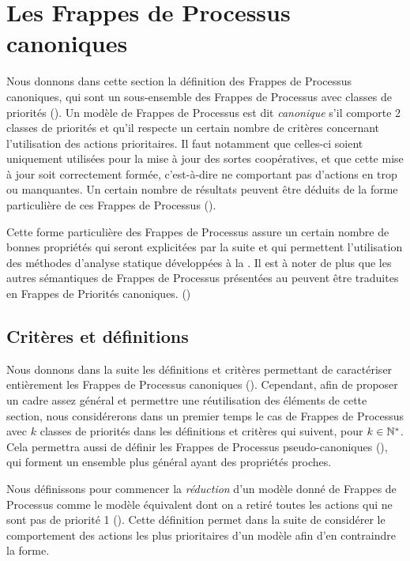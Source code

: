 
\section{Les Frappes de Processus canoniques}

Nous donnons dans cette section la définition des Frappes de Processus canoniques,
qui sont un sous-ensemble des Frappes de Processus avec classes de priorités
().
Un modèle de Frappes de Processus est dit \emph{canonique} s'il comporte 2 classes de priorités
et qu'il respecte un certain nombre de critères concernant l'utilisation des actions prioritaires.
Il faut notamment que celles-ci soient uniquement utilisées pour la mise à jour des sortes
coopératives, et que cette mise à jour soit correctement formée,
c'est-à-dire ne comportant pas d'actions en trop ou manquantes.
Un certain nombre de résultats peuvent être déduits de la forme particulière de ces
Frappes de Processus ().

Cette forme particulière des Frappes de Processus assure un certain nombre de bonnes propriétés
qui seront explicitées par la suite et qui permettent l'utilisation des méthodes d'analyse statique
développées à la .
Il est à noter de plus que les autres sémantiques de Frappes de Processus
présentées au 
peuvent être traduites en Frappes de Priorités canoniques.
()



\subsection{Critères et définitions}

Nous donnons dans la suite les définitions et critères permettant de caractériser entièrement
les Frappes de Processus canoniques ().
Cependant, afin de proposer un cadre assez général et permettre une réutilisation des éléments
de cette section,
nous considérerons dans un premier temps le cas de Frappes de Processus avec $k$
classes de priorités dans les définitions et critères qui suivent, pour $k \in \mathbb{N}^*$.
Cela permettra aussi de définir les Frappes de Processus pseudo-canoniques
(),
qui forment un ensemble plus général ayant des propriétés proches.

Nous définissons pour commencer la \emph{réduction} d'un modèle donné de Frappes de Processus
comme le modèle équivalent dont on a retiré toutes les actions qui ne sont pas de priorité 1
().
Cette définition permet dans la suite de considérer le comportement des actions les plus prioritaires
d'un modèle afin d'en contraindre la forme.


